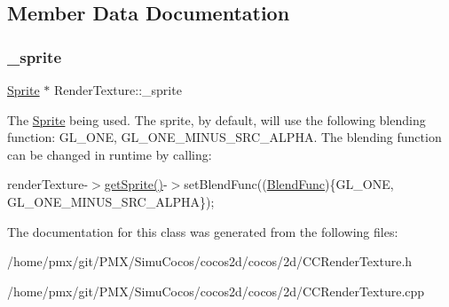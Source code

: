 \subsection{Member Data Documentation}
\mbox{\label{classRenderTexture_a79cb2034e0a68e453c3c905800f6f440}} 
\subsubsection{\texorpdfstring{\+\_\+sprite}{\_sprite}}
{\footnotesize\ttfamily \hyperlink{classSprite}{Sprite} $\ast$ Render\+Texture\+::\+\_\+sprite\hspace{0.3cm}{\ttfamily [protected]}}

The \hyperlink{classSprite}{Sprite} being used. The sprite, by default, will use the following blending function\+: G\+L\+\_\+\+O\+NE, G\+L\+\_\+\+O\+N\+E\+\_\+\+M\+I\+N\+U\+S\+\_\+\+S\+R\+C\+\_\+\+A\+L\+P\+HA. The blending function can be changed in runtime by calling\+:
\begin{DoxyItemize}
\item render\+Texture-\/$>$\hyperlink{classRenderTexture_a89c3bcda8dbca417127adbce86cc3bb6}{get\+Sprite()}-\/$>$set\+Blend\+Func((\hyperlink{structBlendFunc}{Blend\+Func})\{G\+L\+\_\+\+O\+NE, G\+L\+\_\+\+O\+N\+E\+\_\+\+M\+I\+N\+U\+S\+\_\+\+S\+R\+C\+\_\+\+A\+L\+P\+HA\}); 
\end{DoxyItemize}

The documentation for this class was generated from the following files\+:\begin{DoxyCompactItemize}
\item 
/home/pmx/git/\+P\+M\+X/\+Simu\+Cocos/cocos2d/cocos/2d/C\+C\+Render\+Texture.\+h\item 
/home/pmx/git/\+P\+M\+X/\+Simu\+Cocos/cocos2d/cocos/2d/C\+C\+Render\+Texture.\+cpp\end{DoxyCompactItemize}
